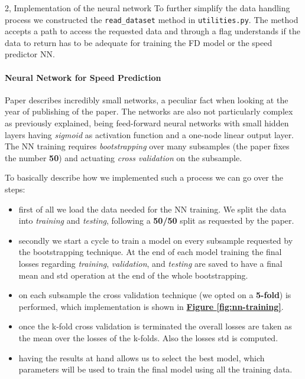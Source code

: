 \documentclass[10pt,a4paper]{article}
\begin{document}
\begin{task}{2, Implementation of the neural network}
To further simplify the data handling process we constructed the \texttt{read\_dataset} method in \texttt{utilities.py}. The method accepts a path to access the requested data and through a flag understands if the data to return has to be adequate for training the FD model or the speed predictor NN.

\paragraph{Neural Network for Speed Prediction}
Paper describes incredibly small networks, a peculiar fact when looking at the year of publishing of the paper. The networks are also not particularly complex as previously explained, being feed-forward neural networks with small hidden layers having \textit{sigmoid} as activation function and a one-node linear output layer.\\
The NN training requires \textit{bootstrapping} over many subsamples (the paper fixes the number \textbf{50}) and actuating \textit{cross validation} on the subsample. 

To basically describe how we implemented such a process we can go over the steps:
\begin{itemize}
    \item first of all we load the data needed for the NN training. We split the data into \textit{training} and \textit{testing}, following a \textbf{50/50} split as requested by the paper.
    \item secondly we start a cycle to train a model on every subsample requested by the bootstrapping technique. At the end of each model training the final losses regarding \textit{training}, \textit{validation}, and \textit{testing} are saved to have a final mean and std operation at the end of the whole bootstrapping.
    \item on each subsample the cross validation technique (we opted on a \textbf{5-fold}) is performed, which implementation is shown in \textbf{\hyperref[fig:nn-training]{Figure \ref{fig:nn-training}}}.
    \item once the k-fold cross validation is terminated the overall losses are taken as the mean over the losses of the k-folds. Also the losses std is computed. 
    \item having the results at hand allows us to select the best model, which parameters will be used to train the final model using all the training data.
\end{itemize}


\end{task}
\end{document}

